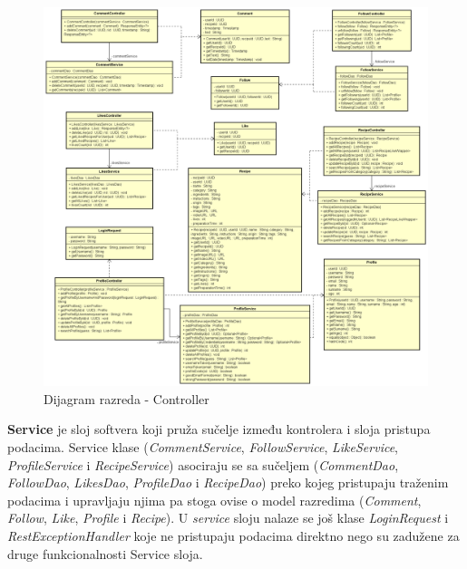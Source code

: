 \begin{figure}[H]
			    \centering
			    \includegraphics[width=1\linewidth]{slike//dijagrami/Controller.png}
			    \caption{Dijagram razreda - Controller}
			    \label{fig:enter-label}
			\end{figure}
	\eject		
 \noindent \textbf{Service} je sloj softvera koji pruža sučelje između kontrolera i sloja pristupa podacima. Service klase (\textit{CommentService}, \textit{FollowService}, \textit{LikeService}, \textit{ProfileService} i \textit{RecipeService}) asociraju se sa sučeljem (\textit{CommentDao}, \textit{FollowDao}, \textit{LikesDao}, \textit{ProfileDao} i \textit{RecipeDao}) preko kojeg pristupaju traženim podacima i upravljaju njima pa stoga ovise o model razredima (\textit{Comment}, \textit{Follow}, \textit{Like}, \textit{Profile} i \textit{Recipe}). U \textit{service} sloju nalaze se još klase \textit{LoginRequest} i \textit{RestExceptionHandler} koje ne pristupaju podacima direktno nego su zadužene za druge funkcionalnosti Service sloja.
 
